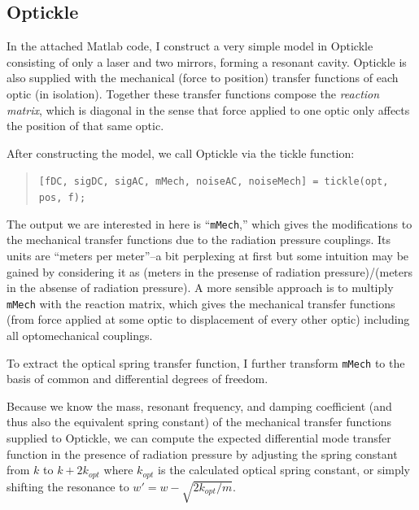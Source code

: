 

\subsection{Optickle}

In the attached Matlab code, I construct a very simple model in Optickle\cite{Evans2007Optickle}
consisting of only a laser and two mirrors, forming a resonant cavity.
Optickle is also supplied with the mechanical (force to position)
transfer functions of each optic (in isolation). Together these transfer
functions compose the \emph{reaction matrix}, which is diagonal in
the sense that force applied to one optic only affects the position
of that same optic.

After constructing the model, we call Optickle via the tickle function:
\begin{quote}
\texttt{{[}fDC, sigDC, sigAC, mMech, noiseAC, noiseMech{]} = tickle(opt,
pos, f);}
\end{quote}
The output we are interested in here is {}``\texttt{mMech},'' which
gives the modifications to the mechanical transfer functions due to
the radiation pressure couplings. Its units are {}``meters per meter''--a
bit perplexing at first but some intuition may be gained by considering
it as (meters in the presense of radiation pressure)/(meters in the
absense of radiation pressure). A more sensible approach is to multiply
\texttt{mMech} with the reaction matrix, which gives the mechanical
transfer functions (from force applied at some optic to displacement
of every other optic) including all optomechanical couplings.

To extract the optical spring transfer function, I further transform
\texttt{mMech} to the basis of common and differential degrees of
freedom.

Because we know the mass, resonant frequency, and damping coefficient
(and thus also the equivalent spring constant) of the mechanical transfer
functions supplied to Optickle, we can compute the expected differential
mode transfer function in the presence of radiation pressure by adjusting
the spring constant from $k$ to $k+2k_{opt}$ where $k_{opt}$ is
the calculated optical spring constant, or simply shifting the resonance
to $w'=w-\sqrt{2k_{opt}/m}$.

